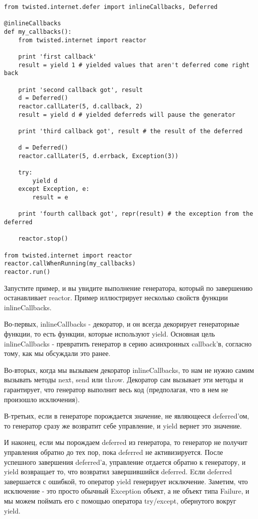  \begin{verbatim}
from twisted.internet.defer import inlineCallbacks, Deferred

@inlineCallbacks
def my_callbacks():
    from twisted.internet import reactor

    print 'first callback'
    result = yield 1 # yielded values that aren't deferred come right back

    print 'second callback got', result
    d = Deferred()
    reactor.callLater(5, d.callback, 2)
    result = yield d # yielded deferreds will pause the generator

    print 'third callback got', result # the result of the deferred

    d = Deferred()
    reactor.callLater(5, d.errback, Exception(3))

    try:
        yield d
    except Exception, e:
        result = e

    print 'fourth callback got', repr(result) # the exception from the deferred

    reactor.stop()

from twisted.internet import reactor
reactor.callWhenRunning(my_callbacks)
reactor.run()
\end{verbatim} 


Запустите пример, и вы увидите выполнение генератора, 
который по завершению останавливает reactor. Пример иллюстрирует 
несколько свойств функции inlineCallbacks.


Во-первых, 
inlineCallbacks - декоратор, и он всегда декорирует 
генераторные функции, то есть функции, которые используют 
yield. Основная цель inlineCallbacks - превратить генератор 
в серию асинхронных callback'в, согласно тому, как мы 
обсуждали это ранее.


Во-вторых, когда мы вызываем декоратор inlineCallbacks, то 
нам не нужно самим вызывать методы next, send или throw. 
Декоратор сам вызывает эти методы и 
гарантирует, что генератор выполнит весь код (предполагая, 
что в нем не произошло исключения). 


В-третьих, если в генераторе порождается значение, не являющееся 
deferred'ом, то генератор сразу же возвратит себе управление, и 
yield вернет это значение. 


И наконец, если мы порождаем deferred из генератора, 
то генератор не получит управления обратно до тех пор, пока 
deferred не активизируется. После успешного завершения deferred'а, 
управление отдается обратно к генератору, и yield возвращает 
то, что возвратил завершившийся deferred. Eсли 
deferred завершается с ошибкой, то оператор yield генерирует 
исключение. Заметим, что исключение - это просто обычный 
Exception объект, а не объект типа Failure, и мы можем 
поймать его с помощью оператора try/except, обернутого вокруг yield.


